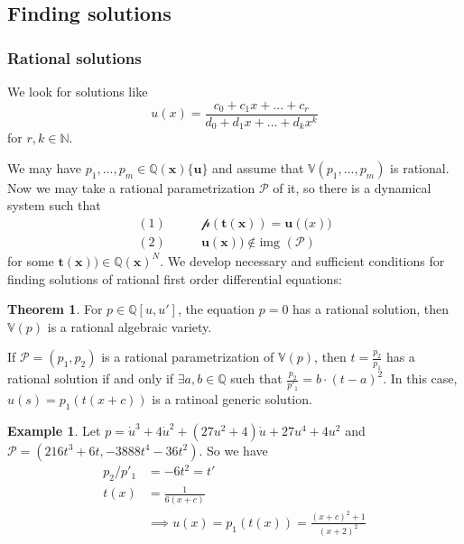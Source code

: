\documentclass{article}
\theoremstyle{definition}
\newtheorem{thm}{Theorem}
\newtheorem{ex}{Example}
\newcommand{\N}{\mathbb{N}}
\newcommand{\Q}{\mathbb{Q}}
\newcommand{\img}{\text{img }}
\begin{document}
\subsection{Finding solutions}
\subsubsection{Rational solutions}
We look for solutions like
$$u(x)=\frac{c_0+c_1x+...+c_r}{d_0+d_1x+...+d_kx^k}
$$ for $r,k\in\N$.\par
We may have $p_1,...,p_m\in\Q(\mathbf x)\{\mathbf{u}\}$ and assume that $\mathbb V(p_1,...,p_m)$ is rational. Now we may take a rational parametrization $\mathcal P$ of it, so there is a dynamical system such that
\begin{align*}
    (1)&\qquad\mathcal p(\mathbf t(\mathbf x))=\mathbf u(\mathbf (x))\\
    (2)&\qquad \mathbf u(\mathbf x))\not\in\img(\mathcal P)
\end{align*}
for some $\mathbf t(\mathbf x))\in\Q(\mathbf x)^N$.
We develop necessary and sufficient conditions for finding solutions of rational first order differential equations:
\begin{thm}
    For $p\in\Q[u,u']$, the equation $p=0$ has a rational solution, then $\mathbb V(p)$ is a rational algebraic variety.\par
    If $\mathcal P=(p_1,p_2)$ is a rational parametrization of $\mathbb V(p)$, then $t=\frac{p_2}{p_1}$ has a rational solution if and only if $\exists a,b\in\Q$ such that $\frac{p_2}{p'_1}=b·(t-a)^2$. In this case, $u(s)=p_1(t(x+c))$ is a ratinoal generic solution.
\end{thm}
\begin{ex}
    Let $p=\dot u^3+4\dot u^2+ (27u^2+4)\dot u+27u^4+4u^2$ and $\mathcal P=(216t^3+6t,-3888t^4-36t^2)$. So we have
    \begin{align*}p_2/p'_1&=-6t^2=t'\\t(x)&=\frac{1}{6(x+c)}\\&\implies u(x)=p_1(t(x))=\frac{(x+c)^2+1}{(x+2)^2}\end{align*}
\end{ex}
\end{document}
